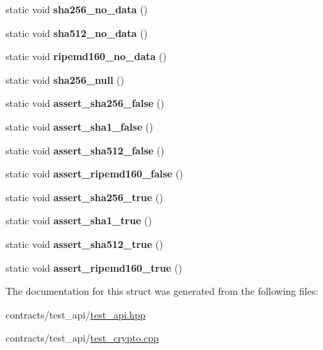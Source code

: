 \begin{DoxyCompactItemize}
static void {\bfseries sha256\+\_\+no\+\_\+data} ()
\item 
\mbox{\label{structtest__crypto_a03232eb90d1b401a867f89dbf1a34590}} 
static void {\bfseries sha512\+\_\+no\+\_\+data} ()
\item 
\mbox{\label{structtest__crypto_a3c98f501772e3c071825c3096da552d8}} 
static void {\bfseries ripemd160\+\_\+no\+\_\+data} ()
\item 
\mbox{\label{structtest__crypto_aa2339098ff47c32630e29d9dafa67049}} 
static void {\bfseries sha256\+\_\+null} ()
\item 
\mbox{\label{structtest__crypto_a981d2a6d1ccb3f11809bea44e5e085da}} 
static void {\bfseries assert\+\_\+sha256\+\_\+false} ()
\item 
\mbox{\label{structtest__crypto_a61a3e4056c0302eb28c4204940cccf4f}} 
static void {\bfseries assert\+\_\+sha1\+\_\+false} ()
\item 
\mbox{\label{structtest__crypto_a5917ece5f49ead2fe515820f4b09fbb6}} 
static void {\bfseries assert\+\_\+sha512\+\_\+false} ()
\item 
\mbox{\label{structtest__crypto_a81e0ac50b1547c4bee59a07a42a7ba22}} 
static void {\bfseries assert\+\_\+ripemd160\+\_\+false} ()
\item 
\mbox{\label{structtest__crypto_a7de7f6686ce2c446e5af66a6ab273f22}} 
static void {\bfseries assert\+\_\+sha256\+\_\+true} ()
\item 
\mbox{\label{structtest__crypto_a108864dff908701e8eb424d6346373ac}} 
static void {\bfseries assert\+\_\+sha1\+\_\+true} ()
\item 
\mbox{\label{structtest__crypto_ab1db7dc501fe25a76f5e82eee6c8ff40}} 
static void {\bfseries assert\+\_\+sha512\+\_\+true} ()
\item 
\mbox{\label{structtest__crypto_a6a1130a74e2bd7c5dc5be5e4d90b29ea}} 
static void {\bfseries assert\+\_\+ripemd160\+\_\+true} ()
\end{DoxyCompactItemize}


The documentation for this struct was generated from the following files\+:\begin{DoxyCompactItemize}
\item 
contracts/test\+\_\+api/\mbox{\hyperlink{test__api_8hpp}{test\+\_\+api.\+hpp}}\item 
contracts/test\+\_\+api/\mbox{\hyperlink{test__crypto_8cpp}{test\+\_\+crypto.\+cpp}}\end{DoxyCompactItemize}
